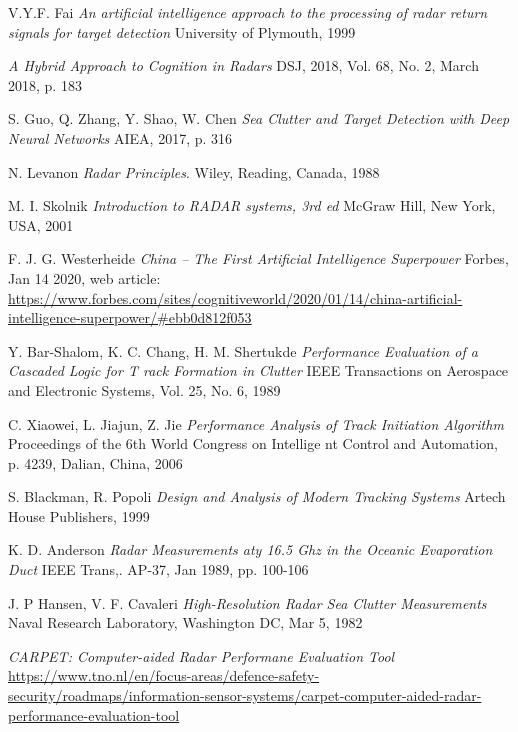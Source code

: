 \documentclass[letterpaper]{book}
\begin{document}
\begin{thebibliography}{9}

V.Y.F. Fai
\textit{An artificial intelligence approach to the processing of radar return signals for target detection}
University of Plymouth, 1999

\textit{A Hybrid Approach to Cognition in Radars}
DSJ, 2018, Vol. 68, No. 2, March 2018, p. 183

S. Guo, Q. Zhang, Y. Shao, W. Chen
\textit{Sea Clutter and Target Detection with Deep Neural Networks}
AIEA, 2017, p. 316

N. Levanon 
\textit{Radar Principles}. 
Wiley, Reading, Canada, 1988
 
M. I. Skolnik
\textit{Introduction to RADAR systems, 3rd ed}
McGraw Hill, New York, USA, 2001

F. J. G. Westerheide
\textit{China – The First Artificial Intelligence Superpower}
Forbes, Jan 14 2020, web article: \url{https://www.forbes.com/sites/cognitiveworld/2020/01/14/china-artificial-intelligence-superpower/#ebb0d812f053}

Y. Bar-Shalom, K. C. Chang,  H. M. Shertukde
\textit{Performance Evaluation of a Cascaded  Logic for T rack Formation in Clutter}
IEEE Transactions  on  Aerospace  and  Electronic  Systems, Vol. 25, No. 6, 1989

C. Xiaowei, L. Jiajun, Z. Jie
\textit{Performance Analysis of Track Initiation Algorithm}
Proceedings  of  the  6th  World  Congress  on  Intellige nt Control and Automation, p. 4239, Dalian, China, 2006

S. Blackman, R. Popoli
\textit{Design  and  Analysis  of  Modern  Tracking Systems}
Artech House Publishers, 1999

K. D. Anderson
\textit{Radar Measurements aty 16.5 Ghz in the Oceanic Evaporation Duct}
IEEE Trans,. AP-37, Jan 1989, pp. 100-106

J. P Hansen, V. F. Cavaleri
\textit{High-Resolution Radar Sea Clutter Measurements}
Naval Research Laboratory, Washington DC, Mar 5, 1982

\textit{CARPET: Computer-aided Radar Performane Evaluation Tool}
\url{https://www.tno.nl/en/focus-areas/defence-safety-security/roadmaps/information-sensor-systems/carpet-computer-aided-radar-performance-evaluation-tool}

\end{thebibliography}
\end{document}
